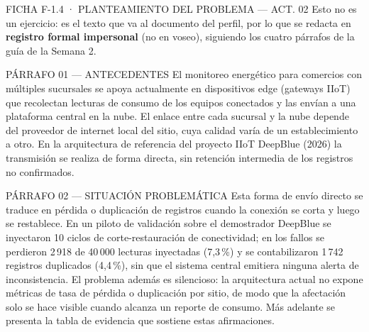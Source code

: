 \documentclass[11pt,a4paper]{article}
\begin{document}
\begin{seccion}{\faBook}{FICHA F-1.4 · PLANTEAMIENTO DEL PROBLEMA --- ACT. 02}
{\small
Esto no es un ejercicio: es el texto que va al documento del perfil, por lo que se redacta en \textbf{registro formal impersonal} (no en voseo), siguiendo los cuatro párrafos de la guía de la Semana 2.
}

\begin{seccion}{\faAlignLeft}{PÁRRAFO 01 --- ANTECEDENTES}
{\small
El monitoreo energético para comercios con múltiples sucursales se apoya actualmente en dispositivos edge (gateways IIoT) que recolectan lecturas de consumo de los equipos conectados y las envían a una plataforma central en la nube. El enlace entre cada sucursal y la nube depende del proveedor de internet local del sitio, cuya calidad varía de un establecimiento a otro. En la arquitectura de referencia del proyecto IIoT DeepBlue (2026) la transmisión se realiza de forma directa, sin retención intermedia de los registros no confirmados.
}
\end{seccion}

\begin{seccion}{\faExclamationTriangle}{PÁRRAFO 02 --- SITUACIÓN PROBLEMÁTICA}
{\small
Esta forma de envío directo se traduce en pérdida o duplicación de registros cuando la conexión se corta y luego se restablece. En un piloto de validación sobre el demostrador DeepBlue se inyectaron 10 ciclos de corte-restauración de conectividad; en los fallos se perdieron 2\,918 de 40\,000 lecturas inyectadas (7,3\,\%) y se contabilizaron 1\,742 registros duplicados (4,4\,\%), sin que el sistema central emitiera ninguna alerta de inconsistencia. El problema además es silencioso: la arquitectura actual no expone métricas de tasa de pérdida o duplicación por sitio, de modo que la afectación solo se hace visible cuando alcanza un reporte de consumo. Más adelante se presenta la tabla de evidencia que sostiene estas afirmaciones.
}
\end{seccion}


\end{seccion}
\end{document}
